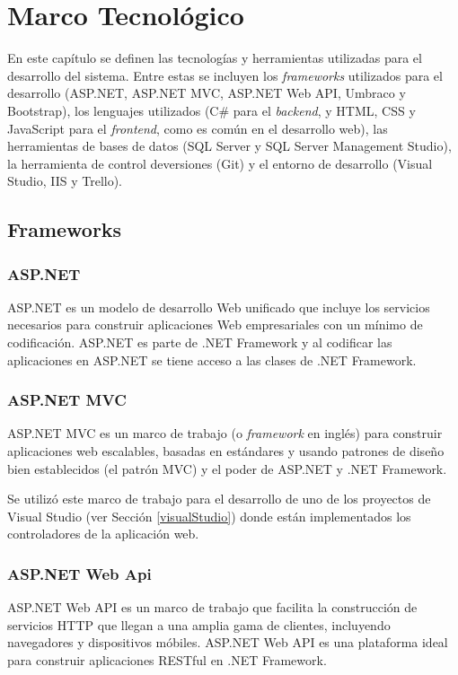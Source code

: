 \chapter{Marco Tecnológico}
En este capítulo se definen las tecnologías y herramientas utilizadas para el desarrollo del sistema. Entre estas se incluyen los \textit{frameworks} utilizados para el desarrollo (ASP.NET, ASP.NET MVC, ASP.NET Web API, Umbraco y Bootstrap), los lenguajes utilizados (C\# para el \textit{backend}, y HTML, CSS y JavaScript para el \textit{frontend}, como es común en el desarrollo web), las herramientas de bases de datos (SQL Server y SQL Server Management Studio), la herramienta de control deversiones (Git) y el entorno de desarrollo (Visual Studio, IIS y Trello).

\section{Frameworks}
    \subsection{ASP.NET}
    ASP.NET \cite{asp.netMicrosoft} es un modelo de desarrollo Web unificado que incluye los servicios necesarios para construir aplicaciones Web empresariales con un mínimo de codificación. ASP.NET es parte de .NET Framework y al codificar las aplicaciones en ASP.NET se tiene acceso a las clases de .NET Framework.

    \subsection{ASP.NET MVC}
    ASP.NET MVC \cite{asp.netMVCMicrosoft} es un marco de trabajo (o \textit{framework} en inglés) para construir aplicaciones web escalables, basadas en estándares y usando patrones de diseño bien establecidos (el patrón MVC) y el poder de ASP.NET y .NET Framework.

    Se utilizó este marco de trabajo para el desarrollo de uno de los proyectos de Visual Studio (ver Sección \ref{visualStudio}) donde están implementados los controladores de la aplicación web.

    \subsection{ASP.NET Web Api}
    ASP.NET Web API \cite{asp.netWebAPIMicrosoft} es un marco de trabajo que facilita la construcción de servicios HTTP que llegan a una amplia gama de clientes, incluyendo navegadores y dispositivos móbiles. ASP.NET Web API es una plataforma ideal para construir aplicaciones RESTful en .NET Framework.

